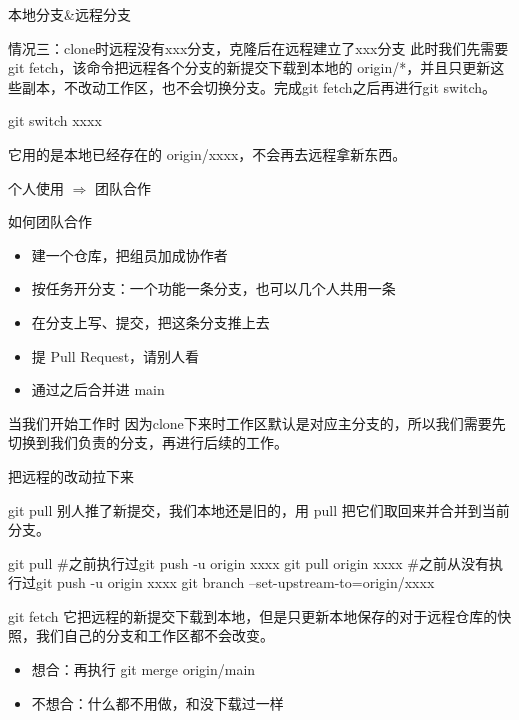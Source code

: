 \documentclass[aspectratio=169]{beamer}
\begin{document}
\begin{frame}[fragile]{本地分支\&远程分支}
\begin{block}{情况三：clone时远程没有xxx分支，克隆后在远程建立了xxx分支}
\hspace*{2em}此时我们先需要git fetch，该命令把远程各个分支的新提交下载到本地的 origin/*，并且只更新这些副本，不改动工作区，也不会切换分支。完成git fetch之后再进行git switch。
\begin{semiverbatim}
git switch xxxx
\end{semiverbatim}
它用的是本地已经存在的 origin/xxxx，不会再去远程拿新东西。
\end{block}
\end{frame}

\begin{frame}{个人使用 $\Rightarrow$ 团队合作}
	\begin{block}{如何团队合作}
		\begin{itemize}
			\item 建一个仓库，把组员加成协作者
			\item 按任务开分支：一个功能一条分支，也可以几个人共用一条
			\item 在分支上写、提交，把这条分支推上去
			\item 提 Pull Request，请别人看
			\item 通过之后合并进 main
		\end{itemize}
	\end{block}
	\begin{block}{当我们开始工作时}
		因为clone下来时工作区默认是对应主分支的，所以我们需要先切换到我们负责的分支，再进行后续的工作。
	\end{block}
\end{frame}

\begin{frame}[fragile]{把远程的改动拉下来}
\begin{block}{git pull}
别人推了新提交，我们本地还是旧的，用 pull 把它们取回来并合并到当前分支。
\vspace{-0.8em}
\begin{semiverbatim}
git pull                           #之前执行过git push -u origin xxxx
git pull origin xxxx            #之前从没有执行过git push -u origin xxxx
git branch --set-upstream-to=origin/xxxx
\end{semiverbatim}
\end{block}
	\begin{block}{git fetch}
		\hspace*{2em}它把远程的新提交下载到本地，但是只更新本地保存的对于远程仓库的快照，我们自己的分支和工作区都不会改变。
		\begin{itemize}
			\item 想合：再执行 git merge origin/main
			\item 不想合：什么都不用做，和没下载过一样
		\end{itemize}
	\end{block}
\end{frame}
\end{document}
